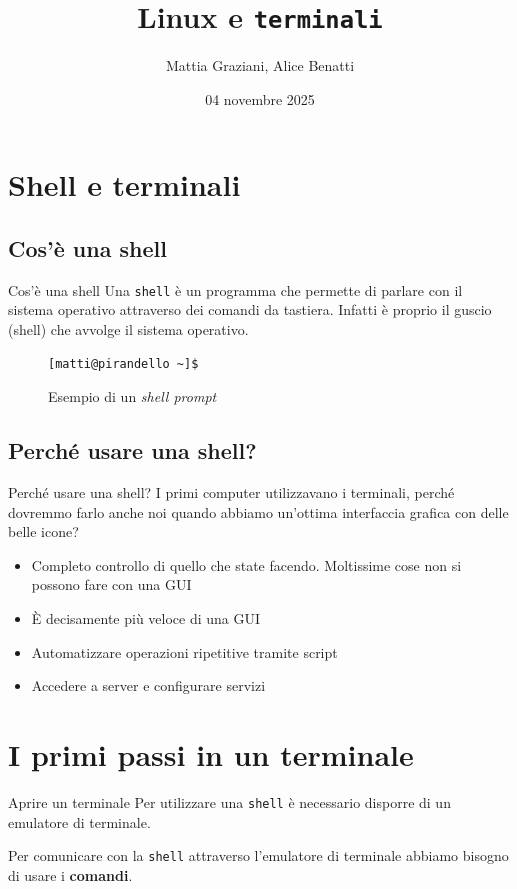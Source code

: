 \documentclass{beamer}
\title{Linux e \texttt{terminali}}
\author{Mattia Graziani, Alice Benatti}
\institute{Università di Bologna, corso di Laurea in Informatica}
\date{04 novembre 2025}
\begin{document}
\begin{frame} 
  \titlepage
\end{frame}

\section{Shell e terminali}

\subsection{Cos'è una shell}
\begin{frame}[fragile]{Cos'è una shell}
  Una \texttt{shell} è un programma che permette di parlare con il sistema 
  operativo attraverso dei comandi da tastiera.
  Infatti è proprio il guscio (shell) che avvolge il sistema operativo.\bigskip
  \begin{figure}
        \begin{lstlisting}
[matti@pirandello ~]$
    \end{lstlisting}
    \caption{Esempio di un \textit{shell prompt}}
  \end{figure}
\end{frame}

\subsection{Perché usare una shell?}
\begin{frame}{Perché usare una shell?}
  I primi computer utilizzavano i terminali, perché dovremmo farlo anche noi
  quando abbiamo un'ottima interfaccia grafica con delle belle icone?\bigskip

  \begin{itemize}
    \item Completo controllo di quello che state facendo. 
      Moltissime cose non si possono fare con una GUI
    \item È decisamente più veloce di una GUI
    \item Automatizzare operazioni ripetitive tramite script
    \item Accedere a server e configurare servizi
  \end{itemize}
\end{frame}

\section{I primi passi in un terminale}
\begin{frame}{Aprire un terminale}
  Per utilizzare una \texttt{shell} è necessario disporre di un emulatore di 
  terminale.\bigskip
  
  Per comunicare con la \texttt{shell} attraverso l'emulatore di terminale
  abbiamo bisogno di usare i \textbf{comandi}.\bigskip
\end{frame}
\end{document}

